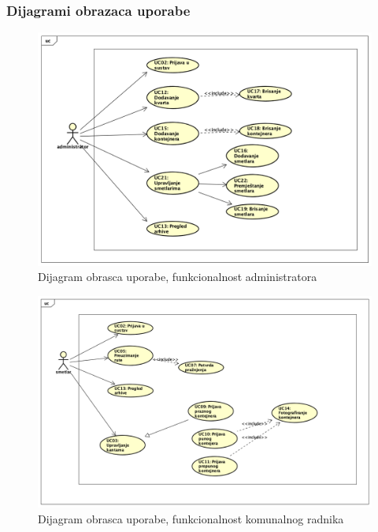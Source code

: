 				
				
				
				
				
					
				\subsubsection{Dijagrami obrazaca uporabe}
					
					
					
						
				\begin{figure}[H]
					\includegraphics[scale=0.5]{figures/UC_za_administratora.PNG}
					\centering
					\caption{Dijagram obrasca uporabe, funkcionalnost administratora}
					\label{fig:ucad-diag}
				\end{figure}
			
				\begin{figure}[H]
					\includegraphics[scale=0.4]{figures/UC_za_smetlara.PNG}
					\centering
					\caption{Dijagram obrasca uporabe, funkcionalnost komunalnog radnika}
					\label{fig:ucad-diag}
				\end{figure}
			
